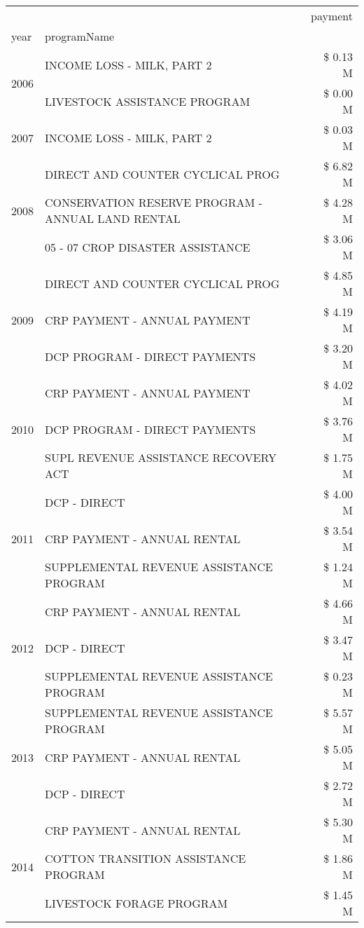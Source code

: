 \begin{tabular}{llr}
\toprule
 &  & payment \\
year & programName &  \\
\midrule
\multirow[t]{2}{*}{2006} & INCOME LOSS - MILK, PART 2 & \$ 0.13 M \\
 & LIVESTOCK ASSISTANCE PROGRAM & \$ 0.00 M \\
\cline{1-3}
2007 & INCOME LOSS - MILK, PART 2 & \$ 0.03 M \\
\cline{1-3}
\multirow[t]{3}{*}{2008} & DIRECT AND COUNTER CYCLICAL PROG & \$ 6.82 M \\
 & CONSERVATION RESERVE PROGRAM - ANNUAL LAND RENTAL & \$ 4.28 M \\
 & 05 - 07 CROP DISASTER ASSISTANCE & \$ 3.06 M \\
\cline{1-3}
\multirow[t]{3}{*}{2009} & DIRECT AND COUNTER CYCLICAL PROG & \$ 4.85 M \\
 & CRP PAYMENT - ANNUAL PAYMENT & \$ 4.19 M \\
 & DCP PROGRAM - DIRECT PAYMENTS & \$ 3.20 M \\
\cline{1-3}
\multirow[t]{3}{*}{2010} & CRP PAYMENT - ANNUAL PAYMENT & \$ 4.02 M \\
 & DCP PROGRAM - DIRECT PAYMENTS & \$ 3.76 M \\
 & SUPL REVENUE ASSISTANCE RECOVERY ACT & \$ 1.75 M \\
\cline{1-3}
\multirow[t]{3}{*}{2011} & DCP - DIRECT & \$ 4.00 M \\
 & CRP PAYMENT - ANNUAL RENTAL & \$ 3.54 M \\
 & SUPPLEMENTAL REVENUE ASSISTANCE PROGRAM & \$ 1.24 M \\
\cline{1-3}
\multirow[t]{3}{*}{2012} & CRP PAYMENT - ANNUAL RENTAL & \$ 4.66 M \\
 & DCP - DIRECT & \$ 3.47 M \\
 & SUPPLEMENTAL REVENUE ASSISTANCE PROGRAM & \$ 0.23 M \\
\cline{1-3}
\multirow[t]{3}{*}{2013} & SUPPLEMENTAL REVENUE ASSISTANCE PROGRAM & \$ 5.57 M \\
 & CRP PAYMENT - ANNUAL RENTAL & \$ 5.05 M \\
 & DCP - DIRECT & \$ 2.72 M \\
\cline{1-3}
\multirow[t]{3}{*}{2014} & CRP PAYMENT - ANNUAL RENTAL & \$ 5.30 M \\
 & COTTON TRANSITION ASSISTANCE PROGRAM & \$ 1.86 M \\
 & LIVESTOCK FORAGE PROGRAM & \$ 1.45 M \\

\end{tabular}
